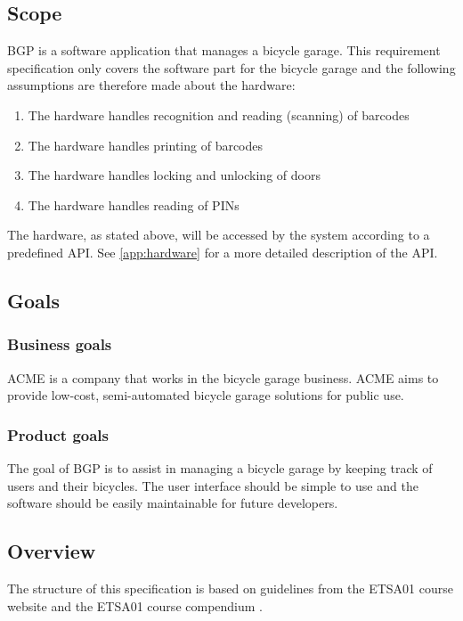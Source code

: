 \documentclass[12pt,titlepage]{article}
\begin{document}
\subsection{Scope}
BGP is a software application that manages a bicycle garage. This requirement specification only covers the software part for the bicycle garage and the following assumptions are therefore made about the hardware:
\begin{enumerate}
	\item The hardware handles recognition and reading (scanning) of barcodes
	\item The hardware handles printing of barcodes
	\item The hardware handles locking and unlocking of doors
	\item The hardware handles reading of PINs
\end{enumerate}
The hardware, as stated above, will be accessed by the system according to a predefined API. See \cref{app:hardware} for a more detailed description of the API.

\subsection{Goals}
\subsubsection{Business goals}
ACME is a company that works in the bicycle garage business. ACME aims to provide low-cost, semi-automated bicycle garage solutions for public use.
\subsubsection{Product goals}
The goal of BGP is to assist in managing a bicycle garage by keeping track of users and their bicycles. The user interface should be simple to use and the software should be easily maintainable for future developers.

\subsection{Overview}
The structure of this specification is based on guidelines from the ETSA01 course website and the ETSA01 course compendium \cite{kompendium,course-site}.
\end{document}
